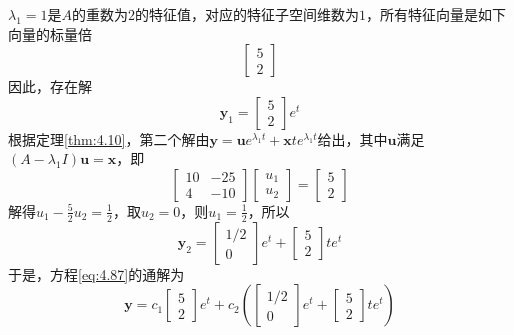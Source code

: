 \begin{solution}
    $\lambda_1=1$是$A$的重数为$2$的特征值，对应的特征子空间维数为$1$，所有特征向量是如下向量的标量倍
    \[
        \begin{bmatrix}
            5 \\
            2
        \end{bmatrix}
    \]
    因此，存在解
    \[
        \mathbf{y}_1=\begin{bmatrix}
            5 \\
            2
        \end{bmatrix}e^{t}
    \]
    根据定理\ref{thm:4.10}，第二个解由$\mathbf{y}=\mathbf{u}e^{\lambda_1 t}+\mathbf{x}te^{\lambda_1 t}$给出，其中$\mathbf{u}$满足$(A-\lambda_1 I)\mathbf{u}=\mathbf{x}$，即
    \[
        \begin{bmatrix}
            10 & -25 \\
            4  & -10
        \end{bmatrix}\begin{bmatrix}
            u_1 \\
            u_2
        \end{bmatrix}=\begin{bmatrix}
            5 \\
            2
        \end{bmatrix}
    \]
    解得$u_1-\frac{5}{2}u_2=\frac{1}{2}$，取$u_2=0$，则$u_1=\frac{1}{2}$，所以
    \[
        \mathbf{y}_2=\begin{bmatrix}
            1/2 \\
            0
        \end{bmatrix}e^{t}+\begin{bmatrix}
            5 \\
            2
        \end{bmatrix}te^{t}
    \]
    于是，方程\ref{eq:4.87}的通解为
    \[
        \mathbf{y}=c_1\begin{bmatrix}
            5 \\
            2
        \end{bmatrix}e^{t}+c_2\left(\begin{bmatrix}
            1/2 \\
            0
        \end{bmatrix}e^{t}+\begin{bmatrix}
            5 \\
            2
        \end{bmatrix}te^{t}\right)
    \]
\end{solution}

